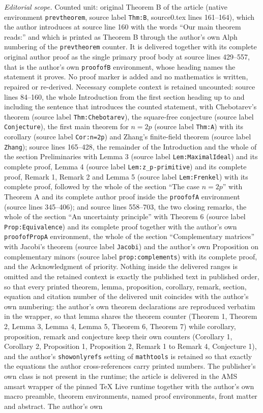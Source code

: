 \documentclass[10pt,a4paper]{amsart}
\begin{document}
\noindent\textit{Editorial scope.} Counted unit: original Theorem B of the article (native environment \texttt{prevtheorem}, source label \texttt{Thm:B}, source0.tex lines 161--164), which the author introduces at source line 160 with the words ``Our main theorem reads:'' and which is printed as Theorem B through the author's own Alph numbering of the \texttt{prevtheorem} counter. It is delivered together with its complete original author proof as the single primary proof body at source lines 429--557, that is the author's own \texttt{proofofB} environment, whose heading names the statement it proves. No proof marker is added and no mathematics is written, repaired or re-derived. Necessary complete context is retained uncounted: source lines 84--160, the whole Introduction from the first section heading up to and including the sentence that introduces the counted statement, with Chebotarev's theorem (source label \texttt{Thm:Chebotarev}), the square-free conjecture (source label \texttt{Conjecture}), the first main theorem for $n=2p$ (source label \texttt{Thm:A}) with its corollary (source label \texttt{Cor:n=2p}) and Zhang's finite-field theorem (source label \texttt{Zhang}); source lines 165--428, the remainder of the Introduction and the whole of the section Preliminaries with Lemma 3 (source label \texttt{Lem:MaximalIdeal}) and its complete proof, Lemma 4 (source label \texttt{Lem:z\_p-primitive}) and its complete proof, Remark 1, Remark 2 and Lemma 5 (source label \texttt{Lem:Frenkel}) with its complete proof, followed by the whole of the section ``The case $n=2p$'' with Theorem A and its complete author proof inside the \texttt{proofofA} environment (source lines 345--406); and source lines 558--703, the two closing remarks, the whole of the section ``An uncertainty principle'' with Theorem 6 (source label \texttt{Prop:Equivalence}) and its complete proof together with the author's own \texttt{proofofPropA} environment, the whole of the section ``Complementary matrices'' with Jacobi's theorem (source label \texttt{Jacobi}) and the author's own Proposition on complementary minors (source label \texttt{prop:complements}) with its complete proof, and the Acknowledgment of priority. Nothing inside the delivered ranges is omitted and the retained context is exactly the published text in published order, so that every printed theorem, lemma, proposition, corollary, remark, section, equation and citation number of the delivered unit coincides with the author's own numbering: the author's own theorem declarations are reproduced verbatim in the wrapper, so that lemma shares the theorem counter (Theorem 1, Theorem 2, Lemma 3, Lemma 4, Lemma 5, Theorem 6, Theorem 7) while corollary, proposition, remark and conjecture keep their own counters (Corollary 1, Corollary 2, Proposition 1, Proposition 2, Remark 1 to Remark 4, Conjecture 1), and the author's \texttt{showonlyrefs} setting of \texttt{mathtools} is retained so that exactly the equations the author cross-references carry printed numbers. The publisher's own class is not present in the runtime; the article is delivered in the AMS amsart wrapper of the pinned TeX Live runtime together with the author's own macro preamble, theorem environments, named proof environments, front matter and abstract. The author's own 
\end{document}
